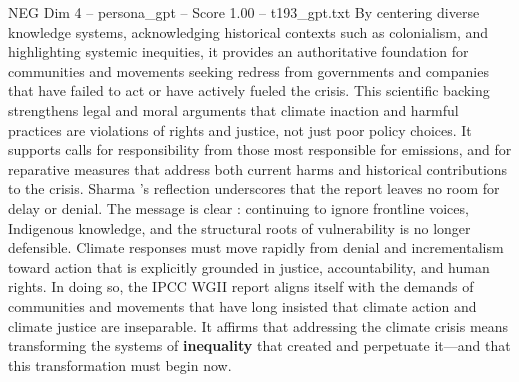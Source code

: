 \begin{textsample}{NEG Dim 4 – persona\_gpt – Score 1.00 – t193\_gpt.txt}
By centering diverse knowledge systems, acknowledging historical contexts such as colonialism, and highlighting systemic inequities, it provides an authoritative foundation for communities and movements seeking redress from governments and companies that have failed to act or have actively fueled the crisis.
This scientific backing strengthens legal and moral arguments that climate inaction and harmful practices are violations of rights and justice, not just poor policy choices.
It supports calls for responsibility from those most responsible for emissions, and for reparative measures that address both current harms and historical contributions to the crisis.
Sharma ’s reflection underscores that the report leaves no room for delay or denial.
The message is clear : continuing to ignore frontline voices, Indigenous knowledge, and the structural roots of vulnerability is no longer defensible.
Climate responses must move rapidly from denial and incrementalism toward action that is explicitly grounded in justice, accountability, and human rights.
In doing so, the IPCC WGII report aligns itself with the demands of communities and movements that have long insisted that climate action and climate justice are inseparable.
It affirms that addressing the climate crisis means transforming the systems of \textbf{inequality} that created and perpetuate it—and that this transformation must begin now.

\end{textsample}
